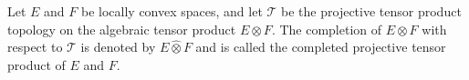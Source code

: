 Let $E$ and $F$ be locally convex spaces, and let $\mathcal{T}$ be the projective tensor product topology on the algebraic tensor product $E \otimes F$. The completion of $E \otimes F$ with respect to $\mathcal{T}$ is denoted by $E \hat{\otimes} F$ and is called the completed projective tensor product of $E$ and $F$.
